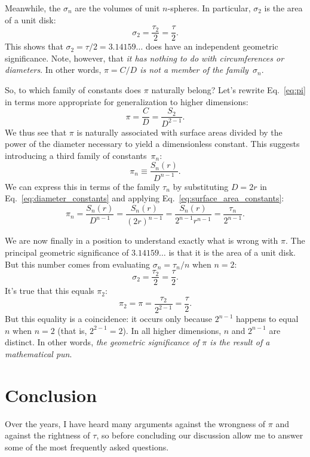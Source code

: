 Meanwhile, the $\sigma_n$ are the volumes of unit $n$-spheres. In particular, $\sigma_2$ is the area of a unit disk:
\[
\sigma_2 = \frac{\tau_2}{2} = \frac{\tau}{2}.
\]
This shows that $\sigma_2 = \tau/2 = 3.14159\ldots$ does have an independent geometric significance. Note, however, that \emph{it has nothing to do with circumferences or diameters}. In other words, \emph{$\pi = C/D$ is not a member of the family~$\sigma_n$}.

So, to which family of constants does $\pi$ naturally belong?
Let's rewrite Eq.~\eqref{eq:pi} in terms more appropriate for generalization to higher dimensions:
\[
\pi = \frac{C}{D} = \frac{S_2}{D^{2-1}}.
\]
We thus see that $\pi$ is naturally associated with surface areas divided by the power of the diameter necessary to yield a dimensionless constant. This suggests introducing a third family of constants~$\pi_n$:
\begin{equation}
\label{eq:diameter_constants}
\pi_n \equiv \frac{S_n(r)}{D^{n-1}}.
\end{equation}
We can express this in terms of the family $\tau_n$ by substituting $D = 2r$ in Eq.~\eqref{eq:diameter_constants} and applying Eq.~\eqref{eq:surface_area_constants}:
\[
\pi_n = \frac{S_n(r)}{D^{n-1}} = \frac{S_n(r)}{(2r)^{n-1}} =
\frac{S_n(r)}{2^{n-1}r^{n-1}} = \frac{\tau_n}{2^{n-1}}.
\]

We are now finally in a position to understand exactly what is wrong with $\pi$. The principal geometric significance of $3.14159\ldots$ is that it is the area of a unit disk. But this number comes from evaluating $\sigma_n = \tau_n/n$ when $n=2$:
\[
\sigma_2 = \frac{\tau_2}{2} = \frac{\tau}{2}.
\]
It's true that this equals $\pi_2$:
\[
\pi_2 = \pi = \frac{\tau_2}{2^{2-1}} = \frac{\tau}{2}.
\]
But this equality is a coincidence: it occurs only because $2^{n-1}$ happens to equal $n$ when $n=2$ (that is, $2^{2-1} = 2$). In all higher dimensions, $n$ and $2^{n-1}$ are distinct. In other words, \emph{the geometric significance of $\pi$ is the result of a mathematical pun}.


\section{Conclusion}
\label{sec:conclusion}

Over the years, I have heard many arguments against the wrongness of $\pi$ and against the rightness of $\tau$, so before concluding our discussion allow me to answer some of the most frequently asked questions.

